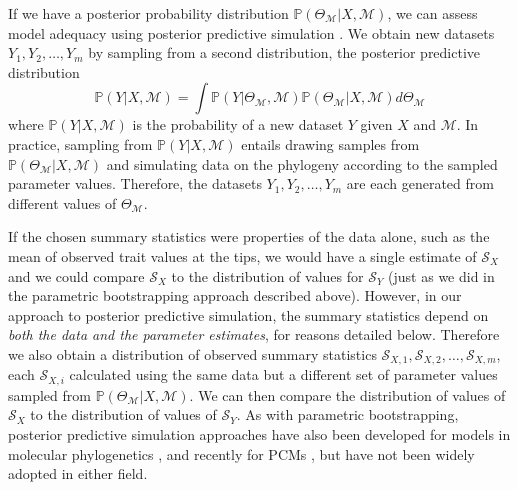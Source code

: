 \documentclass[a4paper,12pt]{article}
\begin{document}
If we have a posterior probability distribution $\mathbb{P}(\Theta_{\mathcal{M}}|X, \mathcal{M})$, we can assess model adequacy using posterior predictive simulation \citep{Rubin1984, Gelman1996}. We obtain new datasets $Y_1, Y_2, \ldots, Y_m$ by sampling from a second distribution, the posterior predictive distribution
\begin{equation}
\mathbb{P}(Y|X,\mathcal{M}) = \int \mathbb{P}(Y|\Theta_{\mathcal{M}}, \mathcal{M})\mathbb{P}(\Theta_{\mathcal{M}}|X,\mathcal{M})d\Theta_{\mathcal{M}}
\end{equation}
where $\mathbb{P}(Y|X,\mathcal{M})$ is the probability of a new dataset $Y$ given $X$ and $\mathcal{M}$. In practice, sampling from $\mathbb{P}(Y|X,\mathcal{M})$ entails drawing samples from $\mathbb{P}(\Theta_{\mathcal{M}}|X, \mathcal{M})$ and simulating data on the phylogeny according to the sampled parameter values. Therefore, the datasets $Y_1, Y_2, \ldots, Y_m$ are each generated from different values of $\Theta_{\mathcal{M}}$.

If the chosen summary statistics were properties of the data alone, such as the mean of observed trait values at the tips, we would have a single estimate of $\mathcal{S}_X$ and we could compare $\mathcal{S}_X$ to the distribution of values for $\mathcal{S}_Y$ (just as we did in the parametric bootstrapping approach described above). However, in our approach to posterior predictive simulation, the summary statistics depend on \emph{both the data and the parameter estimates}, for reasons detailed below. Therefore we also obtain a distribution of observed summary statistics $\mathcal{S}_{X,1}, \mathcal{S}_{X,2}, \ldots, \mathcal{S}_{X,m}$, each $\mathcal{S}_{X,i}$ calculated using the same data but a different set of parameter values sampled from $\mathbb{P}(\Theta_{\mathcal{M}}|X, \mathcal{M})$. We can then compare the distribution of values of $\mathcal{S}_X$ to the distribution of values of $\mathcal{S}_Y$. As with parametric bootstrapping, posterior predictive simulation approaches have also been developed for models in molecular phylogenetics \citep{Bollback2002, Reid2013, Lewis2013, Brown2013}, and recently for PCMs \citep{SlaterPennell}, but have not been widely adopted in either field.
\end{document}
